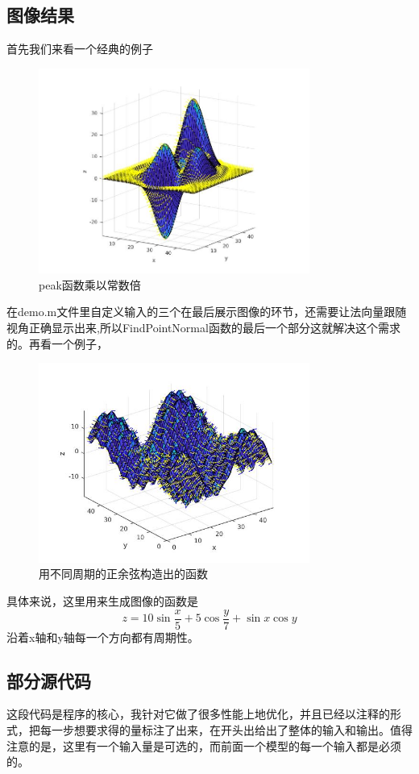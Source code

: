 \documentclass[a4paper, 14pt, twocolumn]{article}
\theoremstyle{definition}
\begin{document}
\subsection{图像结果}
首先我们来看一个经典的例子
\begin{figure}[H]
\includegraphics[width=3.5in]{FindPointNormal/figure/peak.jpg}
\caption{peak函数乘以常数倍}
\end{figure}
在demo.m文件里自定义输入的三个在最后展示图像的环节，还需要让法向量跟随视角正确显示出来,所以FindPointNormal函数的最后一个部分这就解决这个需求的。再看一个例子，
\begin{figure}[H]
\includegraphics[width=3.5in]{FindPointNormal/figure/triangle.jpg}
\flushleft
\caption{用不同周期的正余弦构造出的函数}
\end{figure}
具体来说，这里用来生成图像的函数是
\begin{equation*}
z=10\sin{\frac{x}{5}}+5\cos{\frac{y}{7}}+\sin{x}\cos{y}
\end{equation*}
沿着x轴和y轴每一个方向都有周期性。
\subsection{部分源代码}
这段代码是程序的核心，我针对它做了很多性能上地优化，并且已经以注释的形式，把每一步想要求得的量标注了出来，在开头出给出了整体的输入和输出。值得注意的是，这里有一个输入量是可选的，而前面一个模型的每一个输入都是必须的。

\end{document}
